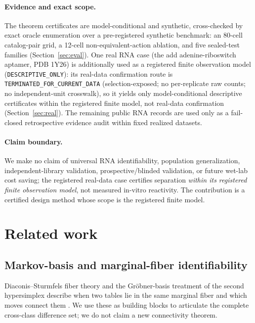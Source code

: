 \documentclass[11pt]{article}
\begin{document}
\paragraph{Evidence and exact scope.}
The theorem certificates are model-conditional and synthetic, cross-checked by exact oracle enumeration
over a pre-registered synthetic benchmark: an 80-cell catalog-pair grid, a 12-cell non-equivalent-action
ablation, and five sealed-test families (Section~\ref{sec:eval}). One real RNA case (the add
adenine-riboswitch aptamer, PDB 1Y26) is additionally used as a registered finite observation model
(\texttt{DESCRIPTIVE\_ONLY}): its real-data confirmation route is
\texttt{TERMINATED\_FOR\_CURRENT\_DATA} (selection-exposed; no per-replicate raw counts; no
independent-unit crosswalk), so it yields only model-conditional descriptive certificates within the
registered finite model, not real-data confirmation (Section~\ref{sec:real}). The remaining public RNA
records are used only as a fail-closed retrospective evidence audit within fixed realized datasets.

\paragraph{Claim boundary.}
We make no claim of universal RNA identifiability, population generalization, independent-library
validation, prospective/blinded validation, or future wet-lab cost saving; the registered real-data case
certifies separation \emph{within its registered finite observation model}, not measured in-vitro
reactivity. The contribution is a certified design method whose scope is the registered finite model.

\section{Related work}\label{sec:related}
\subsection{Markov-basis and marginal-fiber identifiability}
Diaconis--Sturmfels fiber theory and the Gr\"obner-basis treatment of the second hypersimplex describe
when two tables lie in the same marginal fiber and which moves connect them
\citep{diaconis1998markov,deloera1995grobner}. We use these as building blocks to articulate the
complete cross-class difference set; we do not claim a new connectivity theorem.
\end{document}
